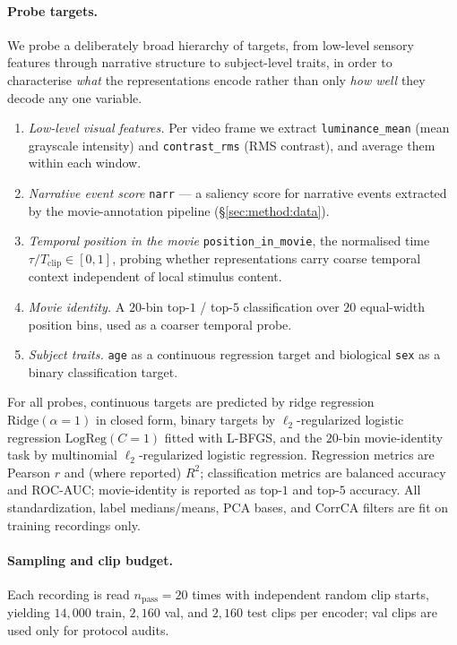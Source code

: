 \paragraph{Probe targets.}
We probe a deliberately broad hierarchy of targets, from low-level
sensory features through narrative structure to subject-level traits,
in order to characterise \emph{what} the representations encode rather
than only \emph{how well} they decode any one variable.
\begin{enumerate}
    \item \textit{Low-level visual features.} Per video frame we
          extract \texttt{luminance\_mean} (mean grayscale intensity)
          and \texttt{contrast\_rms} (RMS contrast), and average them
          within each window.
    \item \textit{Narrative event score} \texttt{narr} — a saliency
          score for narrative events extracted by the
          movie-annotation pipeline (\S\ref{sec:method:data}).
    \item \textit{Temporal position in the movie}
          \texttt{position\_in\_movie}, the normalised time
          $\tau / T_{\text{clip}} \in [0, 1]$, probing whether
          representations carry coarse temporal context independent
          of local stimulus content.
    \item \textit{Movie identity.} A $20$-bin top-$1$ / top-$5$
          classification over $20$ equal-width position bins, used as
          a coarser temporal probe.
    \item \textit{Subject traits.} \texttt{age} as a continuous
          regression target and biological \texttt{sex} as a binary
          classification target.
\end{enumerate}
For all probes, continuous targets are predicted by ridge regression
$\mathrm{Ridge}(\alpha{=}1)$ in closed form, binary targets by
$\ell_2$-regularized logistic regression $\mathrm{LogReg}(C{=}1)$
fitted with L-BFGS, and the $20$-bin movie-identity task by
multinomial $\ell_2$-regularized logistic regression. Regression
metrics are Pearson $r$ and (where reported) $R^2$; classification
metrics are balanced accuracy and ROC-AUC; movie-identity is reported
as top-$1$ and top-$5$ accuracy. All standardization, label
medians/means, PCA bases, and CorrCA filters are fit on training
recordings only.

\paragraph{Sampling and clip budget.}
Each recording is read $n_{\text{pass}} = 20$ times with independent
random clip starts, yielding $14{,}000$ train, $2{,}160$ val, and
$2{,}160$ test clips per encoder; val clips are used only for
protocol audits.

